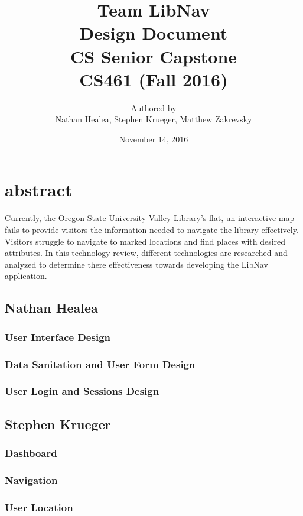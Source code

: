 \documentclass[letterpaper,10pt,titlepage, onecolumn, compsoc]{IEEEtran}
\title{Team LibNav \\ Design Document \\ CS Senior Capstone \\ \vspace{2mm}\small CS461 (Fall 2016)}
\author{Authored by \\ Nathan Healea, Stephen Krueger, Matthew Zakrevsky}
\date{November 14, 2016}
\begin{document}
\maketitle



\section*{abstract}
Currently, the Oregon State University Valley Library's flat, un-interactive map fails to provide visitors the information needed to navigate the library effectively. Visitors struggle to navigate to marked locations and find places with desired attributes. In this technology review, different technologies are researched and analyzed to determine there effectiveness towards developing the LibNav application. 
\newpage

\tableofcontents
\newpage

\subsection{Nathan Healea}
\subsubsection{User Interface Design}
\subsubsection{Data Sanitation and User Form Design}
\subsubsection{User Login and Sessions Design}

\subsection{Stephen Krueger}
\subsubsection{Dashboard}
\subsubsection{Navigation}
\subsubsection{User Location}
\end{document}
